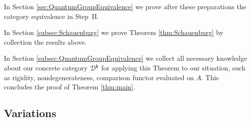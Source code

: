 \documentclass[a4paper, reqno]{amsart}
\theoremstyle{introTheorems}
\newcommand\cD{\mathcal{D}}
\renewcommand{\1}{\mathbbold{1}}
\begin{document}
In Section \ref{sec:QuantumGroupEquivalence} we prove after these preparations the category equivalence in Step~II.

In Section \ref{subsec:Schauenburg} we prove Theorem \ref{thm:Schauenburg} by collection the results above.


In Section \ref{subsec:QuantumGroupEquivalence} we collect all necessary knowledge about our concrete category $\cD^\k$ for applying this Theorem to our situation, such as rigidity, nondegenerateness, comparison functor evaluated on $A$. This concludes the proof of Theorem \ref{thm:main}.\\



\bigskip


\subsection{Variations}\label{sec:variations}
\end{document}
